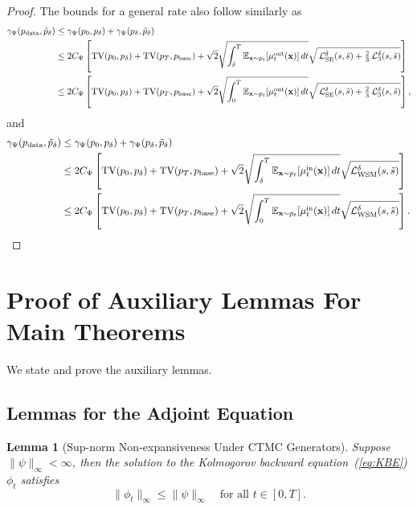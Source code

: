 \documentclass{article} %
\newtheorem{lemma}[theorem]{Lemma}
\def\eqref#1{equation~\ref{#1}}
\newcommand{\bfx}{{\bf x}}
\newcommand{\TV}{\mathrm{TV}}
\newcommand{\LWSM}{\mathcal{L}_{\mathrm{WSM}}}
\newcommand{\LSE}{\mathcal{L}_{\mathrm{SE}}}
\renewcommand{\eqref}[1]{\textup{(\ref{#1})}}
\newcommand{\LThree}{\mathcal{L}_{3}}
\begin{document}
\begin{proof}
    The bounds for a general rate also follow similarly as
    \begin{align*}
        \gamma_\Psi(p_\mathrm{data}, \tilde{p}_\delta) &\leq \gamma_\Psi(p_0, {p}_\delta) + \gamma_\Psi(p_\delta, \tilde{p}_\delta) \\
        &\leq 2 C_\Psi \left[ \TV(p_0, p_\delta) + \TV(p_T, p_\mathrm{base})   +   \sqrt{2} \sqrt{ \int_\delta^T \mathbb{E}_{\bfx \sim p_t}\!\left[ \mu^\mathrm{out}_t(\bfx) \right] dt }  \sqrt{\,\LSE^\delta(s, \tilde{s}) + \tfrac{2}{3}\,\LThree^\delta(s, \tilde{s})} \right] \\
        &\leq 2 C_\Psi \left[ \TV(p_0, p_\delta) + \TV(p_T, p_\mathrm{base})   +   \sqrt{2} \sqrt{ \int_0^T \mathbb{E}_{\bfx \sim p_t}\!\left[ \mu^\mathrm{out}_t(\bfx) \right] dt }  \sqrt{\,\LSE^\delta(s, \tilde{s}) + \tfrac{2}{3}\,\LThree^\delta(s, \tilde{s})} \right],
    \end{align*}
    and 
    \begin{align*}
        \gamma_\Psi(p_\mathrm{data}, \tilde{p}_\delta) &\leq \gamma_\Psi(p_0, {p}_\delta) + \gamma_\Psi(p_\delta, \tilde{p}_\delta) \\
        &\leq 2 C_\Psi \left[ \TV(p_0, p_\delta) + \TV(p_T, p_\mathrm{base})   +  \sqrt{2} \sqrt{ \int_\delta^T \mathbb{E}_{\bfx \sim p_t}\!\left[ \mu^\mathrm{in}_t(\bfx) \right] dt }  \sqrt{\LWSM^\delta(s, \tilde{s})} \right] \\
        &\leq 2 C_\Psi \left[ \TV(p_0, p_\delta) + \TV(p_T, p_\mathrm{base})   +   \sqrt{2} \sqrt{ \int_0^T \mathbb{E}_{\bfx \sim p_t}\!\left[ \mu^\mathrm{in}_t(\bfx) \right] dt }  \sqrt{\LWSM^\delta(s, \tilde{s})} \right].
    \end{align*}
\end{proof}

\section{Proof of Auxiliary Lemmas For Main Theorems}
We state and prove the auxiliary lemmas.

\subsection{Lemmas for the Adjoint Equation}

\begin{lemma}[Sup-norm Non-expansiveness Under CTMC Generators]\label{lemma:phi_bound}
    Suppose $\| \psi \|_\infty < \infty$, then the solution to the Kolmogorov backward equation~\eqref{eq:KBE} $\phi_t$ satisfies
    \begin{equation}
        \| \phi_t \|_\infty \leq \| \psi \|_\infty \quad \text{for all } t\in [0, T].
    \end{equation}
\end{lemma}
\end{document}
